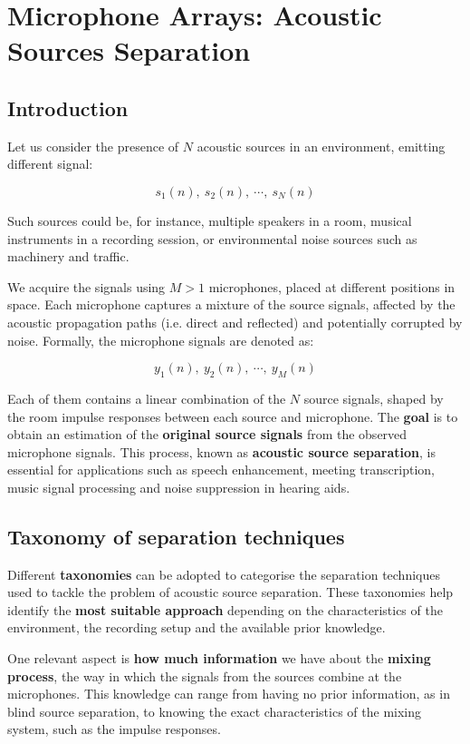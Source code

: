 \section{Microphone Arrays: Acoustic Sources Separation}

\subsection{Introduction}
Let us consider the presence of $N$ acoustic sources in an environment, emitting different signal:

\[
s_{1}(n), \ s_{2}(n), \ \cdots, \ s_{N}(n)
\]

Such sources could be, for instance, multiple speakers in a room, musical instruments in a recording session, or environmental noise sources such as machinery and traffic.

We acquire the signals using $M > 1$ microphones, placed at different positions in space.  
Each microphone captures a mixture of the source signals, affected by the acoustic propagation paths (i.e. direct and reflected) and potentially corrupted by noise.
Formally, the microphone signals are denoted as:

\[
y_{1}(n), \ y_{2}(n), \ \cdots, \ y_{M}(n)
\]

Each of them contains a linear combination of the $N$ source signals, shaped by the room impulse responses between each source and microphone.
The \textbf{goal} is to obtain an estimation of the \textbf{original source signals} from the observed microphone signals.  
This process, known as \textbf{acoustic source separation}, is essential for applications such as speech enhancement, meeting transcription, music signal processing and noise suppression in hearing aids.

\subsection{Taxonomy of separation techniques}
Different \textbf{taxonomies} can be adopted to categorise the separation techniques used to tackle the problem of acoustic source separation.  
These taxonomies help identify the \textbf{most suitable approach} depending on the characteristics of the environment, the recording setup and the available prior knowledge.

One relevant aspect is \textbf{how much information} we have about the \textbf{mixing process}, the way in which the signals from the sources combine at the microphones.  
This knowledge can range from having no prior information, as in blind source separation, to knowing the exact characteristics of the mixing system, such as the impulse responses.

